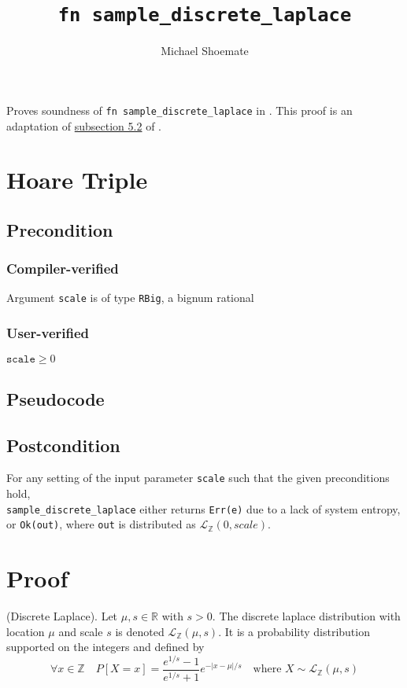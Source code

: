 \documentclass{article}
\title{\texttt{fn sample\_discrete\_laplace}}
\author{Michael Shoemate}
\begin{document}
 
\maketitle 
 
Proves soundness of \texttt{fn sample\_discrete\_laplace} in . 
This proof is an adaptation of \href{https://arxiv.org/pdf/2004.00010.pdf#subsection.5.2}{subsection 5.2} of \cite{CKS20}. 
 
\section{Hoare Triple} 
\subsection*{Precondition} 
\subsubsection*{Compiler-verified} 
Argument \texttt{scale} is of type \texttt{RBig}, a bignum rational 
 
\subsubsection*{User-verified} 
$\texttt{scale} \geq 0$ 
 
\subsection*{Pseudocode}         
 
 
\subsection*{Postcondition} 
\label{postcondition} 
For any setting of the input parameter \texttt{scale} such that the given preconditions hold, \\ 
\texttt{sample\_discrete\_laplace} either returns \texttt{Err(e)} due to a lack of system entropy, 
or \texttt{Ok(out)}, where \texttt{out} is distributed as $\mathcal{L}_\mathbb{Z}(0, scale)$. 
 
\section{Proof} 
\begin{definition} \cite{BV17} 
    (Discrete Laplace). Let $\mu, s \in \mathbb{R}$ with $s > 0$.  
    The discrete laplace distribution with location $\mu$ and scale $s$ is denoted $\mathcal{L}_\mathbb{Z}(\mu, s)$.  
    It is a probability distribution supported on the integers and defined by 
    \begin{equation*} 
        \forall x \in \mathbb{Z} \quad  P[X = x] = \frac{e^{1/s} - 1}{e^{1/s} + 1} e^{-|x-\mu|/s} \quad \text{where } X \sim \mathcal{L}_\mathbb{Z}(\mu, s) 
    \end{equation*} 
\end{definition} 
 
\end{document}
